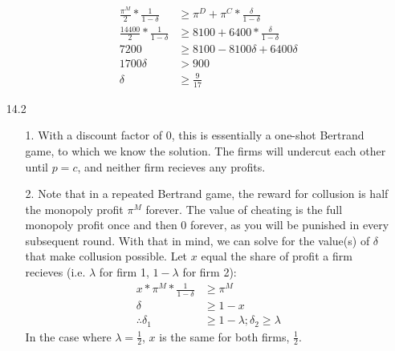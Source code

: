 \documentclass[12pt,letterpaper]{article}
\begin{document}
\begin{enumerate}
\begin{enumerate}
	\begin{align*}
		\frac{\pi^M}{2} * \frac{1}{1-\delta} &\geq \pi^D + \pi^C * \frac{\delta}{1 - \delta}\\
		\frac{14400}{2} * \frac{1}{1-\delta} &\geq 8100 + 6400 * \frac{\delta}{1 - \delta}\\
		7200 &\geq 8100 - 8100\delta + 6400\delta \\
		1700\delta &> 900 \\
		\delta &\geq \frac{9}{17} 
	\end{align*} 
\end{enumerate}


\item[14.2]
\begin{enumerate}
	\item[1.] With a discount factor of 0, this is essentially a one-shot Bertrand game, to which we know the solution. The firms will undercut each other until $p = c$, and neither firm recieves any profits.
	\item[2.] Note that in a repeated Bertrand game, the reward for collusion is half the monopoly profit $\pi^M$ forever. The value of cheating is the full monopoly profit once and then 0 forever, as you will be punished in every subsequent round. With that in mind, we can solve for the value(s) of $\delta$ that make collusion possible. Let $x$ equal the share of profit a firm recieves (i.e. $\lambda$ for firm 1, $1 - \lambda$ for firm 2):
	\begin{align*}
		x * \pi^M * \frac{1}{1-\delta} &\geq \pi^M \\
		\delta &\geq 1 - x \\
		\therefore \delta_1 &\geq 1 - \lambda; \delta_2 \geq \lambda
	\end{align*}  
	In the case where $\lambda = \frac{1}{2}$, $x$ is the same for both firms, $\frac{1}{2}$.


\end{enumerate}
\end{enumerate}
\end{document}
